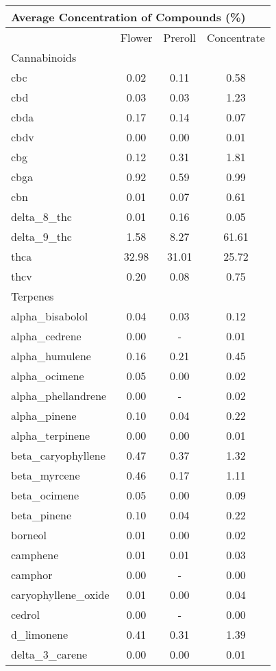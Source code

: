 
\begin{table}[H]
\centering
\begin{tabular}{lccc}
\multicolumn{4}{l}{Average Concentration of Compounds (\%)} \\
\hline
& Flower & Preroll & Concentrate \\
\hline
\multicolumn{4}{l}{Cannabinoids} \\
\hline
cbc & 0.02 & 0.11 & 0.58 \\
cbd & 0.03 & 0.03 & 1.23 \\
cbda & 0.17 & 0.14 & 0.07 \\
cbdv & 0.00 & 0.00 & 0.01 \\
cbg & 0.12 & 0.31 & 1.81 \\
cbga & 0.92 & 0.59 & 0.99 \\
cbn & 0.01 & 0.07 & 0.61 \\
delta\_8\_thc & 0.01 & 0.16 & 0.05 \\
delta\_9\_thc & 1.58 & 8.27 & 61.61 \\
thca & 32.98 & 31.01 & 25.72 \\
thcv & 0.20 & 0.08 & 0.75 \\
\hline
\multicolumn{4}{l}{Terpenes} \\
\hline
alpha\_bisabolol & 0.04 & 0.03 & 0.12 \\
alpha\_cedrene & 0.00 & - & 0.01 \\
alpha\_humulene & 0.16 & 0.21 & 0.45 \\
alpha\_ocimene & 0.05 & 0.00 & 0.02 \\
alpha\_phellandrene & 0.00 & - & 0.02 \\
alpha\_pinene & 0.10 & 0.04 & 0.22 \\
alpha\_terpinene & 0.00 & 0.00 & 0.01 \\
beta\_caryophyllene & 0.47 & 0.37 & 1.32 \\
beta\_myrcene & 0.46 & 0.17 & 1.11 \\
beta\_ocimene & 0.05 & 0.00 & 0.09 \\
beta\_pinene & 0.10 & 0.04 & 0.22 \\
borneol & 0.01 & 0.00 & 0.02 \\
camphene & 0.01 & 0.01 & 0.03 \\
camphor & 0.00 & - & 0.00 \\
caryophyllene\_oxide & 0.01 & 0.00 & 0.04 \\
cedrol & 0.00 & - & 0.00 \\
d\_limonene & 0.41 & 0.31 & 1.39 \\
delta\_3\_carene & 0.00 & 0.00 & 0.01 \\

\end{tabular}
\end{table}
